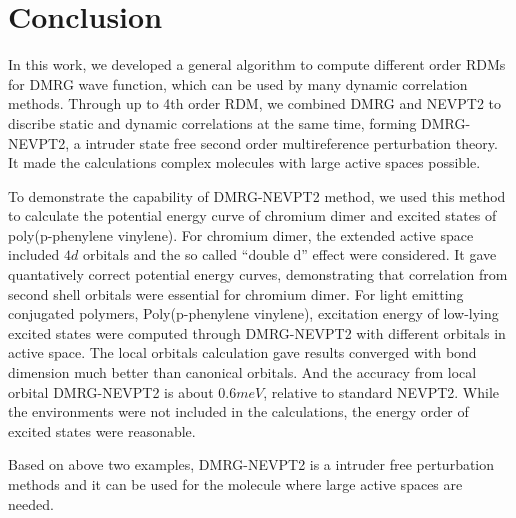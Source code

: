 
\section{Conclusion}

In this work, we developed a general algorithm to compute different order RDMs for DMRG wave function, which can be used by many dynamic correlation methods. 
Through up to 4th order RDM, we combined DMRG and NEVPT2 to discribe static and dynamic correlations at the same time, forming DMRG-NEVPT2, 
a intruder state free second order multireference perturbation theory. 
It made the calculations complex molecules with large active spaces possible. 

To demonstrate the capability of DMRG-NEVPT2 method, we used this method to calculate the potential energy curve of chromium dimer and excited 
states of poly(p-phenylene vinylene). For chromium dimer, the extended active space included $4d$ orbitals and the so called ``double d'' effect 
were considered. It gave quantatively correct potential energy curves, demonstrating that correlation from second shell orbitals were essential for chromium dimer.
For light emitting conjugated polymers, Poly(p-phenylene vinylene), excitation energy of low-lying excited states were computed through DMRG-NEVPT2 
with different orbitals in active space. The local orbitals calculation gave results converged with bond dimension much better than canonical 
orbitals. And the accuracy from local orbital DMRG-NEVPT2 is about $0.6meV$, relative to standard NEVPT2. While the environments were not included 
in the calculations, the energy order of excited states were reasonable.

Based on above two examples, DMRG-NEVPT2 is a intruder free perturbation methods and it can be used for the molecule where large active spaces are needed.
